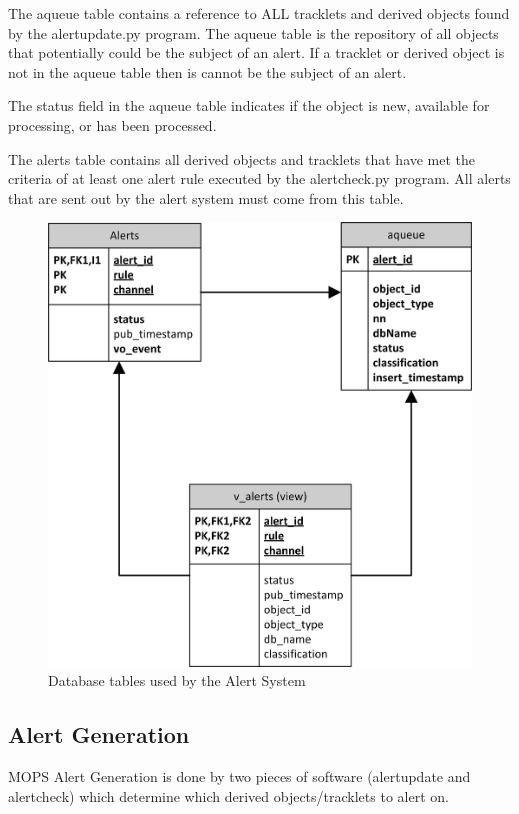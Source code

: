 \documentclass[panstarrs]{panstarrs}
\begin{document}
The aqueue table contains a reference to ALL tracklets and derived objects found by the alertupdate.py program. The aqueue table is the repository of all objects that potentially could be the subject of an alert. If a tracklet or derived object is not in the aqueue table then is cannot be the subject of an alert.

The status field in the aqueue table indicates if the object is new, available for processing, or has been processed.

The alerts table contains all derived objects and tracklets that have met the criteria of at least one alert rule executed by the alertcheck.py program. All alerts that are sent out by the alert system must come from this table. 

\begin{figure}
\begin{center}
\includegraphics[width=7in]{Alerts_DB.jpg}
\caption{Database tables used by the Alert System}
\label{fig:database}
\end{center}
\end{figure}

\subsection{Alert Generation}
MOPS Alert Generation is done by two pieces of software (alertupdate and alertcheck) which determine which derived objects/tracklets to alert on.
\end{document}
